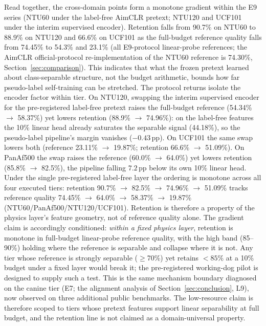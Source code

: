 Read together, the cross-domain points form a monotone gradient within the E9 series (NTU60 under the label-free AimCLR pretext; NTU120 and UCF101 under the interim supervised encoder). Retention falls from 90.7\% on NTU60 to 88.9\% on NTU120 and 66.6\% on UCF101 as the full-budget reference quality falls from 74.45\% to 54.3\% and 23.1\% (all E9-protocol linear-probe references; the AimCLR official-protocol re-implementation of the NTU60 reference is 74.30\%, Section~\ref{sec:comparison}). This indicates that what the frozen pretext learned about class-separable structure, not the budget arithmetic, bounds how far pseudo-label self-training can be stretched. The protocol returns isolate the encoder factor within tier. On NTU120, swapping the interim supervised encoder for the pre-registered label-free pretext raises the full-budget reference (54.34\% $\to$ 58.37\%) yet lowers retention (88.9\% $\to$ 74.96\%): on the label-free features the 10\% linear head already saturates the separable signal (44.18\%), so the pseudo-label pipeline's margin vanishes ($-0.43$\,pp). On UCF101 the same swap lowers both (reference 23.11\% $\to$ 19.87\%; retention 66.6\% $\to$ 51.09\%). On PanAf500 the swap raises the reference (60.0\% $\to$ 64.0\%) yet lowers retention (85.8\% $\to$ 82.5\%), the pipeline falling $7.2$\,pp below its own 10\% linear head. Under the single pre-registered label-free layer the ordering is monotone across all four executed tiers: retention 90.7\% $\to$ 82.5\% $\to$ 74.96\% $\to$ 51.09\% tracks reference quality 74.45\% $\to$ 64.0\% $\to$ 58.37\% $\to$ 19.87\% (NTU60/PanAf500/NTU120/UCF101). Retention is therefore a property of the physics layer's feature geometry, not of reference quality alone. The gradient claim is accordingly conditioned: \emph{within a fixed physics layer}, retention is monotone in full-budget linear-probe reference quality, with the high band (85--90\%) holding where the reference is separable and collapse where it is not. Any tier whose reference is strongly separable ($\geq$70\%) yet retains $<85\%$ at a 10\% budget under a fixed layer would break it; the pre-registered working-dog pilot is designed to supply such a test. This is the same mechanism boundary diagnosed on the canine tier (E7; the alignment analysis of Section~\ref{sec:conclusion}, L9), now observed on three additional public benchmarks. The low-resource claim is therefore scoped to tiers whose pretext features support linear separability at full budget, and the retention line is not claimed as a domain-universal property.

